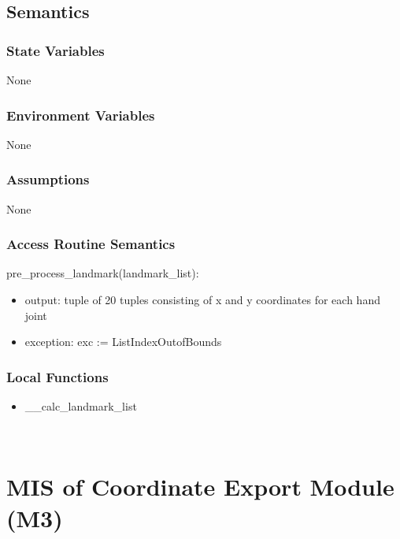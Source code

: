 \documentclass[12pt, titlepage]{article}
\begin{document}
\subsection{Semantics}

\subsubsection{State Variables}

None\\

\subsubsection{Environment Variables}

None\\

\subsubsection{Assumptions}

None

\subsubsection{Access Routine Semantics}

\noindent pre\_process\_landmark(landmark\_list):
\begin{itemize}
\item output: tuple of 20 tuples consisting of x and y coordinates for each hand joint\\
\item exception: exc := ListIndexOutofBounds\\
\end{itemize}

\subsubsection{Local Functions}
\begin{itemize}
\item \_\_calc\_landmark\_list\\
\end{itemize}

~\newpage

\section{MIS of Coordinate Export Module (M3)} \label{M3}
\end{document}
